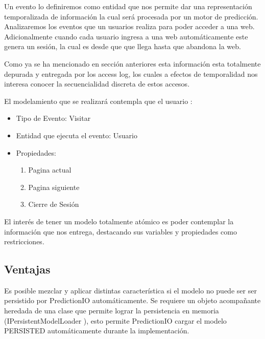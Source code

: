   Un evento lo definiremos como entidad que nos permite dar una representación temporalizada de información la cual será procesada por un motor de predicción. Analizaremos los eventos que un usuarios realiza para poder acceder a una web. Adicionalmente cuando cada usuario ingresa a una web automáticamente este genera un sesión, la cual es desde que que llega hasta que abandona la web.

  Como ya se ha mencionado en sección anteriores esta información esta totalmente depurada y entregada por los access log, los cuales a efectos de temporalidad nos interesa conocer la secuencialidad discreta de estos accesos.
  



  El modelamiento que se realizará contempla que el usuario :


    \begin{itemize}
      \item Tipo de Evento: Visitar
      \item Entidad que ejecuta el evento: Usuario
      \item Propiedades:
          \begin{enumerate}
            \item Pagina actual
            \item Pagina siguiente
            \item Cierre de Sesión
          \end{enumerate}
    \end{itemize}



    El interés de tener un modelo totalmente atómico es poder contemplar la información que nos entrega, destacando sus variables y propiedades como restricciones.



\subsection{Ventajas }


  Es posible mezclar y aplicar distintas característica si el modelo no puede ser ser persistido por PredictionIO automáticamente. Se requiere un objeto acompañante heredada de una clase que permite lograr la persistencia en memoria (IPersistentModelLoader ), esto permite PredictionIO  cargar el modelo PERSISTED automáticamente durante la implementación.

